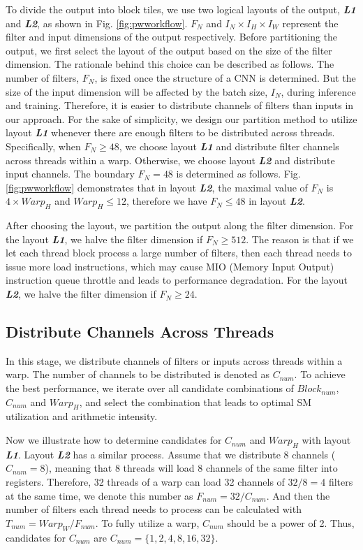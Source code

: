 To divide the output into block tiles, we use two logical layouts of the output, \textbf{\emph{L1}} and \textbf{\emph{L2}}, as shown in Fig. \ref{fig:pwworkflow}.
$F_N$ and $I_N \times I_H \times I_W$ represent the filter and input dimensions of the output respectively.
Before partitioning the output, we first select the layout of the output based on the size of the filter dimension.
The rationale behind this choice can be described as follows.
The number of filters, $F_N$, is fixed once the structure of a CNN is determined.
But the size of the input dimension will be affected by the batch size, $I_N$, during inference and training.
Therefore, it is easier to distribute channels of filters than inputs in our approach.
For the sake of simplicity, we design our partition method to utilize layout \textbf{\emph{L1}} whenever there are enough filters to be distributed across threads.
Specifically, when $F_N \ge 48$, we choose layout \textbf{\emph{L1}} and distribute filter channels across threads within a warp.
Otherwise, we choose layout \textbf{\emph{L2}} and distribute input channels.
The boundary $F_N = 48$ is determined as follows.
Fig. \ref{fig:pwworkflow} demonstrates that in layout \textbf{\emph{L2}}, the maximal value of $F_N$ is $4 \times Warp_H$ and $Warp_H \leq 12$, therefore we have $F_N \leq 48$ in layout \textbf{\emph{L2}}.

After choosing the layout, we partition the output along the filter dimension.
For the layout \textbf{\emph{L1}}, we halve the filter dimension if $F_N \geq 512$.
The reason is that if we let each thread block process a large number of filters, then each thread needs to issue more load instructions, which may cause MIO (Memory Input Output) instruction queue throttle and leads to performance degradation.
For the layout \textbf{\emph{L2}}, we halve the filter dimension if $F_N \geq 24$.

\subsection{Distribute Channels Across Threads}
In this stage, we distribute channels of filters or inputs across threads within a warp.
The number of channels to be distributed is denoted as $C_{num}$.
To achieve the best performance, we iterate over all candidate combinations of $Block_{num}$, $C_{num}$ and $Warp_H$, and select the combination that leads to optimal SM utilization and arithmetic intensity.

Now we illustrate how to determine candidates for $C_{num}$ and $Warp_H$ with layout \textbf{\emph{L1}}.
Layout \textbf{\emph{L2}} has a similar process.
Assume that we distribute 8 channels ($C_{num}=8$), meaning that 8 threads will load 8 channels of the same filter into registers.
Therefore, 32 threads of a warp can load 32 channels of $32/8=4$ filters at the same time, we denote this number as $F_{num}=32/C_{num}$.
And then the number of filters each thread needs to process can be calculated with $T_{num}=Warp_W/F_{num}$.
To fully utilize a warp, $C_{num}$ should be a power of 2.
Thus, candidates for $C_{num}$ are $C_{num}=\{1,2,4,8,16,32\}$.

